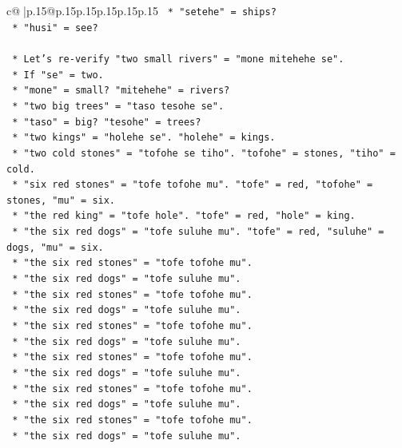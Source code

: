 \documentclass{article}
\begin{document}
{\begin{supertabular}{c@{$\;$}|p{.15\linewidth}@{}p{.15\linewidth}p{.15\linewidth}p{.15\linewidth}p{.15\linewidth}p{.15\linewidth}}
{{{\texttt{        *   "setehe" = ships?} \\
\texttt{        *   "husi" = see?} \\
\\ 
\texttt{    *   Let's re{-}verify "two small rivers" = "mone mitehehe se".} \\
\texttt{        *   If "se" = two.} \\
\texttt{        *   "mone" = small? "mitehehe" = rivers?} \\
\texttt{        *   "two big trees" = "taso tesohe se".} \\
\texttt{        *   "taso" = big? "tesohe" = trees?} \\
\texttt{        *   "two kings" = "holehe se". "holehe" = kings.} \\
\texttt{        *   "two cold stones" = "tofohe se tiho". "tofohe" = stones, "tiho" = cold.} \\
\texttt{        *   "six red stones" = "tofe tofohe mu". "tofe" = red, "tofohe" = stones, "mu" = six.} \\
\texttt{        *   "the red king" = "tofe hole". "tofe" = red, "hole" = king.} \\
\texttt{        *   "the six red dogs" = "tofe suluhe mu". "tofe" = red, "suluhe" = dogs, "mu" = six.} \\
\texttt{        *   "the six red stones" = "tofe tofohe mu".} \\
\texttt{        *   "the six red dogs" = "tofe suluhe mu".} \\
\texttt{        *   "the six red stones" = "tofe tofohe mu".} \\
\texttt{        *   "the six red dogs" = "tofe suluhe mu".} \\
\texttt{        *   "the six red stones" = "tofe tofohe mu".} \\
\texttt{        *   "the six red dogs" = "tofe suluhe mu".} \\
\texttt{        *   "the six red stones" = "tofe tofohe mu".} \\
\texttt{        *   "the six red dogs" = "tofe suluhe mu".} \\
\texttt{        *   "the six red stones" = "tofe tofohe mu".} \\
\texttt{        *   "the six red dogs" = "tofe suluhe mu".} \\
\texttt{        *   "the six red stones" = "tofe tofohe mu".} \\
\texttt{        *   "the six red dogs" = "tofe suluhe mu".} \\
}}}
\end{supertabular}}
\end{document}
